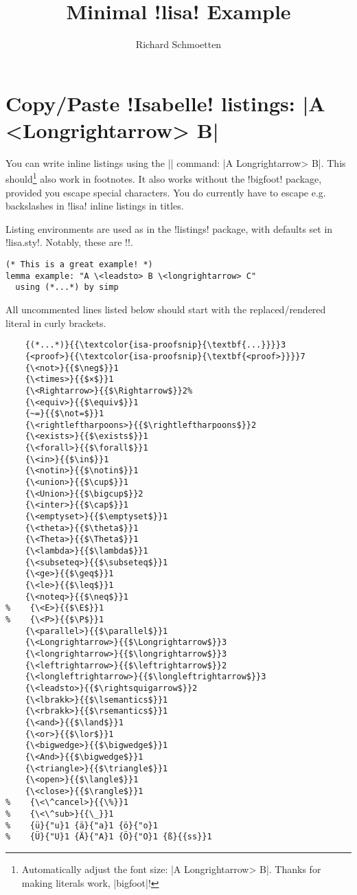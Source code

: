\documentclass[]{article}
\title{Minimal \lisa!lisa! Example}
\author{Richard Schmoetten}
\begin{document}
\maketitle

\section{Copy/Paste \lisa!Isabelle! listings: \lisa|A \\<Longrightarrow> B|}

You can write inline listings using the \lisa|\lisa| command: \lisa|A \<Longrightarrow> B|. This should\footnote{Automatically adjust the font size: \lisa|A \<Longrightarrow> B|. Thanks for making literals work, \lisa|bigfoot|!} also work in footnotes. It also works without the \lisa!bigfoot! package, provided you escape special characters. You do currently have to escape e.g. backslashes in \lisa!lisa! inline listings in titles.

Listing environments are used as in the \lisa!listings! package, with defaults set in \lisa!lisa.sty!. Notably, these are \lisa!\footnotesize!.
\begin{lstlisting}
(* This is a great example! *)
lemma example: "A \<leadsto> B \<longrightarrow> C"
  using (*...*) by simp
\end{lstlisting}

\pagebreak
All uncommented lines listed below should start with the replaced/rendered literal in curly brackets.
\begin{lstlisting}
    {(*...*)}{{\textcolor{isa-proofsnip}{\textbf{...}}}}3
    {<proof>}{{\textcolor{isa-proofsnip}{\textbf{<proof>}}}}7
    {\<not>}{{$\neg$}}1
    {\<times>}{{$×$}}1
    {\<Rightarrow>}{{$\Rightarrow$}}2%
    {\<equiv>}{{$\equiv$}}1
    {~=}{{$\not=$}}1
    {\<rightleftharpoons>}{{$\rightleftharpoons$}}2
    {\<exists>}{{$\exists$}}1
    {\<forall>}{{$\forall$}}1
    {\<in>}{{$\in$}}1
    {\<notin>}{{$\notin$}}1
    {\<union>}{{$\cup$}}1
    {\<Union>}{{$\bigcup$}}2
    {\<inter>}{{$\cap$}}1
    {\<emptyset>}{{$\emptyset$}}1
    {\<theta>}{{$\theta$}}1
    {\<Theta>}{{$\Theta$}}1
    {\<lambda>}{{$\lambda$}}1
    {\<subseteq>}{{$\subseteq$}}1
    {\<ge>}{{$\geq$}}1
    {\<le>}{{$\leq$}}1
    {\<noteq>}{{$\neq$}}1
%    {\<E>}{{$\E$}}1
%    {\<P>}{{$\P$}}1
    {\<parallel>}{{$\parallel$}}1
    {\<Longrightarrow>}{{$\Longrightarrow$}}3
    {\<longrightarrow>}{{$\longrightarrow$}}3
    {\<leftrightarrow>}{{$\leftrightarrow$}}2
    {\<longleftrightarrow>}{{$\longleftrightarrow$}}3
    {\<leadsto>}{{$\rightsquigarrow$}}2
    {\<lbrakk>}{{$\lsemantics$}}1
    {\<rbrakk>}{{$\rsemantics$}}1
    {\<and>}{{$\land$}}1
    {\<or>}{{$\lor$}}1
    {\<bigwedge>}{{$\bigwedge$}}1
    {\<And>}{{$\bigwedge$}}1
    {\<triangle>}{{$\triangle$}}1
    {\<open>}{{$\langle$}}1
    {\<close>}{{$\rangle$}}1
%    {\<\^cancel>}{{\%}}1
%    {\<\^sub>}{{\_}}1
%    {ü}{"u}1 {ä}{"a}1 {ö}{"o}1
%    {Ü}{"U}1 {Ä}{"A}1 {Ö}{"O}1 {ß}{{ss}}1
\end{lstlisting}
\end{document}
